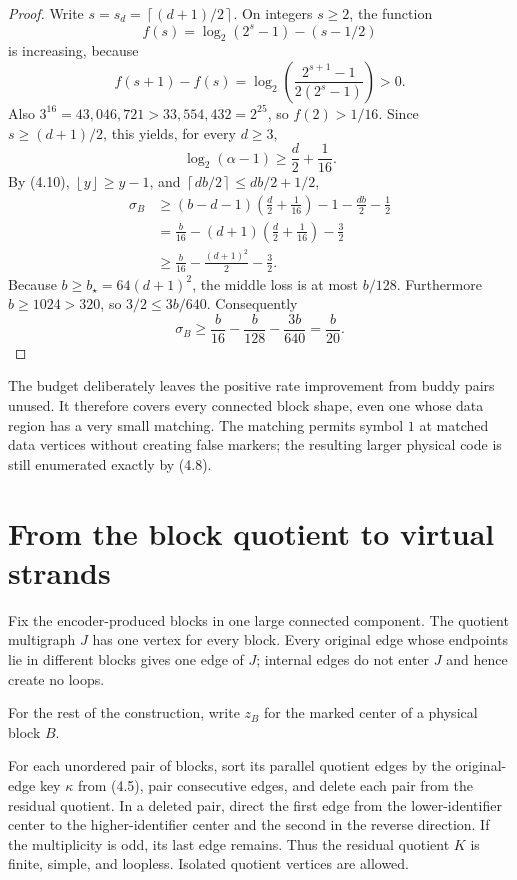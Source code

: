 \documentclass[11pt]{article}
\theoremstyle{definition}
\theoremstyle{remark}
\newcommand{\ceil}[1]{\left\lceil #1\right\rceil}
\newcommand{\floor}[1]{\left\lfloor #1\right\rfloor}
\begin{document}
\begin{proof}
Write $s=s_d=\ceil{(d+1)/2}$.  On integers $s\ge2$, the function
\[
 f(s)=\log_2(2^s-1)-(s-1/2)
\]
is increasing, because
\[
 f(s+1)-f(s)=
 \log_2\!\left(\frac{2^{s+1}-1}{2(2^s-1)}\right)>0.
\]
Also $3^{16}=43{,}046{,}721>33{,}554{,}432=2^{25}$, so
$f(2)>1/16$.  Since $s\ge(d+1)/2$, this yields, for every $d\ge3$,
\[
                    \log_2(\alpha-1)\ge\frac d2+\frac1{16}.   \tag{4.12}
\]
By (4.10), $\floor y\ge y-1$, and
$\ceil{db/2}\le db/2+1/2$,
\begin{align*}
 \sigma_B
 &\ge (b-d-1)\left(\frac d2+\frac1{16}\right)
       -1-\frac{db}{2}-\frac12\\
 &=\frac b{16}-(d+1)\left(\frac d2+\frac1{16}\right)-\frac32\\
 &\ge\frac b{16}-\frac{(d+1)^2}{2}-\frac32.
\end{align*}
Because $b\ge b_\star=64(d+1)^2$, the middle loss is at most $b/128$.
Furthermore $b\ge1024>320$, so $3/2\le3b/640$.  Consequently
\[
 \sigma_B\ge\frac b{16}-\frac b{128}-\frac{3b}{640}
             =\frac b{20}.
\]
\end{proof}

The budget deliberately leaves the positive rate improvement from buddy
pairs unused.  It therefore covers every connected block shape, even one
whose data region has a very small matching.  The matching permits symbol
$1$ at matched data vertices without creating false markers; the resulting
larger physical code is still enumerated exactly by (4.8).

\section{From the block quotient to virtual strands}
\label{sec:quotient}

Fix the encoder-produced blocks in one large connected component.  The quotient
multigraph $J$ has one vertex for every block.  Every original edge whose
endpoints lie in different blocks gives one edge of $J$; internal edges do
not enter $J$ and hence create no loops.

For the rest of the construction, write $z_B$ for the marked center of a
physical block $B$.

For each unordered pair of blocks, sort its parallel quotient edges by the
original-edge key $\kappa$ from (4.5), pair consecutive edges, and delete
each pair from the residual quotient.  In a deleted pair, direct the first
edge from the lower-identifier center to the higher-identifier center and
the second in the reverse direction.  If the multiplicity is odd, its last
edge remains.  Thus the residual quotient $K$ is finite, simple, and
loopless.  Isolated quotient vertices are allowed.
\end{document}
